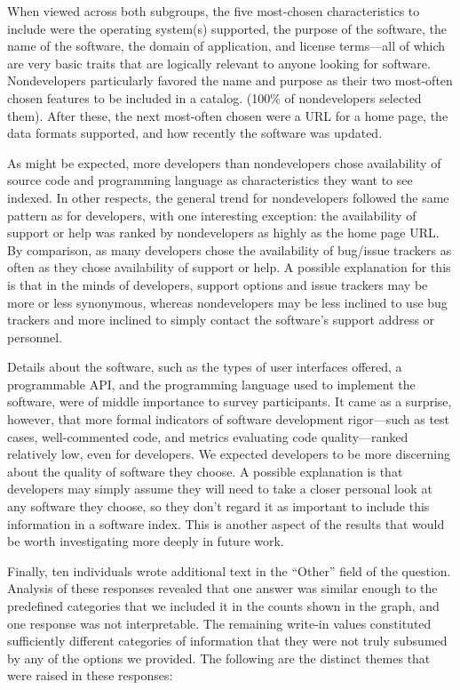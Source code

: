 \documentclass{casicswhitepaper}
\begin{document}
When viewed across both subgroups, the five most-chosen characteristics to include were the operating system(s) supported, the purpose of the software, the name of the software, the domain of application, and license terms---all of which are very basic traits that are logically relevant to anyone looking for software.  Nondevelopers particularly favored the name and purpose as their two most-often chosen features to be included in a catalog.  (100\% of nondevelopers selected them).  After these, the next most-often chosen were a URL for a home page, the data formats supported, and how recently the software was updated.

As might be expected, more developers than nondevelopers chose availability of source code and programming language as characteristics they want to see indexed.  In other respects, the general trend for nondevelopers followed the same pattern as for developers, with one interesting exception: the availability of support or help was ranked by nondevelopers as highly as the home page URL.  By comparison, as many developers chose the availability of bug/issue trackers as often as they chose availability of support or help.  A possible explanation for this is that in the minds of developers, support options and issue trackers may be more or less synonymous, whereas nondevelopers may be less inclined to use bug trackers and more inclined to simply contact the software's support address or personnel.

Details about the software, such as the types of user interfaces offered, a programmable API, and the programming language used to implement the software, were of middle importance to survey participants.  It came as a surprise, however, that more formal indicators of software development rigor---such as test cases, well-commented code, and metrics evaluating code quality---ranked relatively low, even for developers.  We expected developers to be more discerning about the quality of software they choose.  A possible explanation is that developers may simply assume they will need to take a closer personal look at any software they choose, so they don't regard it as important to include this information in a software index.  This is another aspect of the results that would be worth investigating more deeply in future work.

Finally, ten individuals wrote additional text in the ``Other'' field of the question.  Analysis of these responses revealed that one answer was similar enough to the predefined categories that we included it in the counts shown in the graph, and one response was not interpretable.  The remaining write-in values constituted sufficiently different categories of information that they were not truly subsumed by any of the options we provided.  The following are the distinct themes that were raised in these responses:
\end{document}
